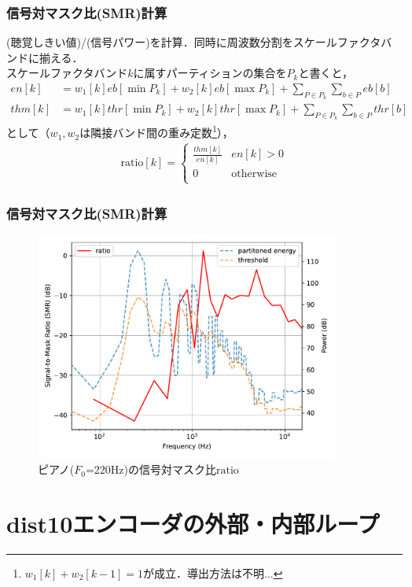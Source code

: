 \documentclass[14pt,xcolor=dvipsnames,table,dvipdfmx]{beamer}
\begin{document}
\begin{frame}[c]
    \frametitle{信号対マスク比(SMR)計算}
    (聴覚しきい値)/(信号パワー)を計算．同時に周波数分割をスケールファクタバンドに揃える．\\
    スケールファクタバンド$k$に属すパーティションの集合を$P_{k}$と書くと，
    \footnotesize
    \begin{align}
        en[k] &= w_{1}[k] eb[\min P_{k}] + w_{2}[k] eb[\max P_{k}] + \sum_{P \in P_{k}} \sum_{b \in P} eb[b] \\
        thm[k] &= w_{1}[k] thr[\min P_{k}] + w_{2}[k] thr[\max P_{k}] + \sum_{P \in P_{k}} \sum_{b \in P} thr[b]
    \end{align}
    \normalsize
    として（$w_{1}, w_{2}$は隣接バンド間の重み定数\footnote{$w_{1}[k] + w_{2}[k-1] = 1$が成立．導出方法は不明...}），
    \begin{align}
        \mathrm{ratio}[k] = \left\{ \begin{array}{ll}
            \frac{thm[k]}{en[k]} & en[k] > 0 \\
            0 & \text{otherwise} \\
        \end{array} \right.
    \end{align}
\end{frame}

\begin{frame}[c]
    \frametitle{信号対マスク比(SMR)計算}
    \begin{figure}
        \includegraphics[width=100mm]{./figs/psyco_analyze_ratio.pdf}
        \caption*{ピアノ($F_{0}$=220Hz)の信号対マスク比$\mathrm{ratio}$}
    \end{figure}
\end{frame}

\section{dist10エンコーダの外部・内部ループ}
\end{document}
